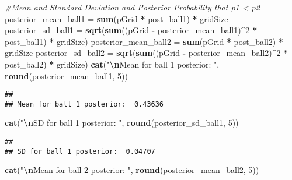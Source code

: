 \documentclass[
]{article}
\newenvironment{Shaded}{\begin{snugshade}}{\end{snugshade}}
\newcommand{\CommentTok}[1]{\textcolor[rgb]{0.56,0.35,0.01}{\textit{#1}}}
\newcommand{\DecValTok}[1]{\textcolor[rgb]{0.00,0.00,0.81}{#1}}
\newcommand{\FunctionTok}[1]{\textcolor[rgb]{0.13,0.29,0.53}{\textbf{#1}}}
\newcommand{\NormalTok}[1]{#1}
\newcommand{\OtherTok}[1]{\textcolor[rgb]{0.56,0.35,0.01}{#1}}
\newcommand{\SpecialCharTok}[1]{\textcolor[rgb]{0.81,0.36,0.00}{\textbf{#1}}}
\newcommand{\StringTok}[1]{\textcolor[rgb]{0.31,0.60,0.02}{#1}}
\begin{document}
\begin{Shaded}
\begin{Highlighting}[]
\CommentTok{\#Mean and Standard Deviation and Posterior Probability that p1 \textless{} p2}
\NormalTok{posterior\_mean\_ball1 }\OtherTok{=} \FunctionTok{sum}\NormalTok{(pGrid }\SpecialCharTok{*}\NormalTok{ post\_ball1) }\SpecialCharTok{*}\NormalTok{ gridSize}
\NormalTok{posterior\_sd\_ball1 }\OtherTok{=} 
  \FunctionTok{sqrt}\NormalTok{(}\FunctionTok{sum}\NormalTok{((pGrid }\SpecialCharTok{{-}}\NormalTok{ posterior\_mean\_ball1)}\SpecialCharTok{\^{}}\DecValTok{2} \SpecialCharTok{*}\NormalTok{ post\_ball1) }\SpecialCharTok{*}\NormalTok{ gridSize)}
\NormalTok{posterior\_mean\_ball2 }\OtherTok{=} \FunctionTok{sum}\NormalTok{(pGrid }\SpecialCharTok{*}\NormalTok{ post\_ball2) }\SpecialCharTok{*}\NormalTok{ gridSize}
\NormalTok{posterior\_sd\_ball2 }\OtherTok{=}  
  \FunctionTok{sqrt}\NormalTok{(}\FunctionTok{sum}\NormalTok{((pGrid }\SpecialCharTok{{-}}\NormalTok{ posterior\_mean\_ball2)}\SpecialCharTok{\^{}}\DecValTok{2} \SpecialCharTok{*}\NormalTok{ post\_ball2) }\SpecialCharTok{*}\NormalTok{ gridSize)}
\FunctionTok{cat}\NormalTok{(}\StringTok{"}\SpecialCharTok{\textbackslash{}n}\StringTok{Mean for ball 1 posterior: "}\NormalTok{, }\FunctionTok{round}\NormalTok{(posterior\_mean\_ball1, }\DecValTok{5}\NormalTok{))}
\end{Highlighting}
\end{Shaded}

\begin{verbatim}
## 
## Mean for ball 1 posterior:  0.43636
\end{verbatim}

\begin{Shaded}
\begin{Highlighting}[]
\FunctionTok{cat}\NormalTok{(}\StringTok{"}\SpecialCharTok{\textbackslash{}n}\StringTok{SD for ball 1 posterior: "}\NormalTok{, }\FunctionTok{round}\NormalTok{(posterior\_sd\_ball1, }\DecValTok{5}\NormalTok{))}
\end{Highlighting}
\end{Shaded}

\begin{verbatim}
## 
## SD for ball 1 posterior:  0.04707
\end{verbatim}

\begin{Shaded}
\begin{Highlighting}[]
\FunctionTok{cat}\NormalTok{(}\StringTok{"}\SpecialCharTok{\textbackslash{}n}\StringTok{Mean for ball 2 posterior: "}\NormalTok{, }\FunctionTok{round}\NormalTok{(posterior\_mean\_ball2, }\DecValTok{5}\NormalTok{))}
\end{Highlighting}
\end{Shaded}
\end{document}
